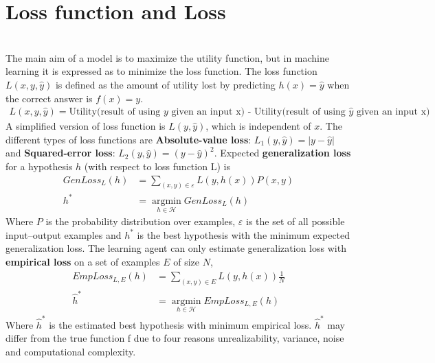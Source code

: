 \documentclass{article}
\begin{document}
\section{Loss function and Loss}
\begin{paragraph}
\\
The main aim of a model is to maximize the utility function, but in machine learning it is expressed as to minimize the loss function. The loss function $L(x, y, \hat{y})$ is defined as the amount of utility lost by predicting $h(x)=\hat{y}$ when the correct answer is $f(x)=y$.
\begin{align*}
     L(x, y, \hat{y}) = \text{Utility(result of using $y$ given an input x) - Utility(result of using $\hat{y}$ given an input x)}
\end{align*}
A simplified version of loss function is $L(y, \hat{y})$, which is independent of $x$. The different types of loss functions are \textbf{Absolute-value loss}: $L_1(y, \hat{y}) = |y-\hat{y}|$ and \textbf{Squared-error loss}: $L_2(y, \hat{y}) = (y - \hat{y})^2$. Expected \textbf{generalization loss} for a hypothesis $h$ (with respect to loss function L) is
  \begin{align*}
      GenLoss_L(h) & = \sum\limits_{(x,y)\in\varepsilon}L(y,h(x))P(x,y) \\
      h^* & = \operatorname*{argmin}_{h\in\mathcal{H}} GenLoss_L(h)
  \end{align*}
Where $P$ is the probability distribution over examples, $\varepsilon$ is the set of all possible input–output examples and $h^*$ is the best hypothesis with the minimum expected generalization loss. The learning agent can only estimate generalization loss with \textbf{empirical loss} on a set of examples $E$ of size $N$,
\begin{align*}
    EmpLoss_{L,E}(h) & = \sum\limits_{(x,y)\in E}L(y,h(x))\frac{1}{N} \\
     \hat{h}^* & = \operatorname*{argmin}_{h\in\mathcal{H}} EmpLoss_{L,E}(h)
\end{align*}
Where $\hat{h}^*$ is the estimated best hypothesis with minimum empirical loss.
$\hat{h}^*$ may differ from the true function f due to four reasons unrealizability, variance, noise and computational complexity.
\end{paragraph}
\end{document}
